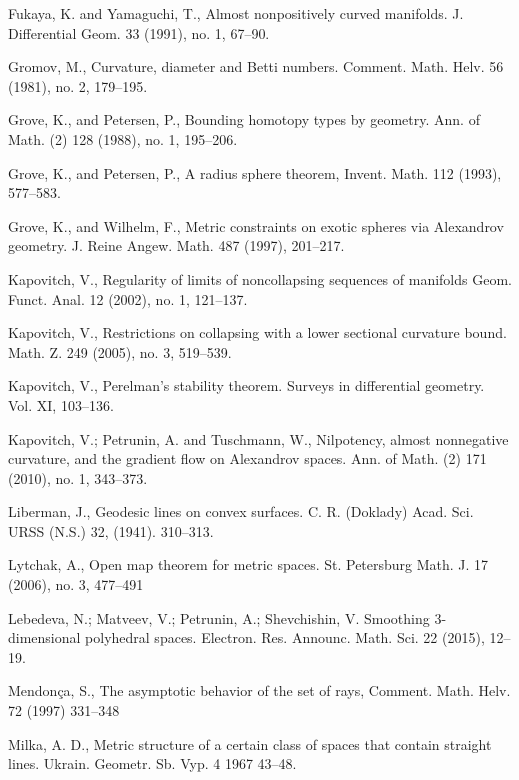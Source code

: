 \documentclass{article}
\begin{document}
\begin{thebibliography}{Bibliography}
Fukaya, K. and Yamaguchi, T., 
Almost nonpositively curved manifolds.  
J. Differential Geom.  33  (1991),  
no. 1, 67--90.

Gromov, M.,
Curvature, diameter and Betti numbers.
Comment. Math. Helv. 56 (1981), no. 2, 179--195. 

Grove, K., and Petersen, P.,
Bounding homotopy types by geometry.
Ann. of Math. (2) 128 (1988), no. 1, 195--206.

Grove, K., and Petersen, P., 
A radius sphere theorem,
Invent. Math. 112 (1993), 577--583.

Grove, K.,
and Wilhelm, F.,
Metric constraints on exotic spheres via Alexandrov geometry.  
J. Reine Angew. Math.  487  (1997), 201--217.

Kapovitch, V., Regularity of limits of noncollapsing sequences of manifolds Geom. Funct. Anal.  12  (2002),  no. 1, 121--137.

Kapovitch, V., 
Restrictions on
collapsing with a lower sectional curvature bound.  Math. Z.  249  (2005),  no.
3, 519--539.

Kapovitch, V., 
Perelman's stability theorem. 
Surveys in differential geometry. Vol. XI, 103--136.

 Kapovitch, V.; 
Petrunin, A. and 
Tuschmann, W., 
Nilpotency, almost nonnegative curvature, and the gradient flow on Alexandrov spaces. 
Ann. of Math. (2) 171 (2010), no. 1, 343--373. 

Liberman, J.,
Geodesic lines on convex surfaces.  C. R.
(Doklady) Acad. Sci. URSS (N.S.)  32,  
(1941). 
310--313.

Lytchak, A.,
Open map theorem for metric spaces.  
St. Petersburg Math. J.  17  (2006),  no. 3, 477--491 

Lebedeva, N.; 
Matveev, V.; 
Petrunin, A.; 
Shevchishin, V.
Smoothing 3-dimensional polyhedral spaces. 
Electron. Res. Announc. Math. Sci. 22 (2015), 12--19.

Mendon\c{c}a, S.,
The asymptotic behavior of the set of rays, 
Comment. Math. Helv. 72 (1997) 331--348

Milka, A. D., 
Metric structure of a certain class of spaces that contain straight lines.  Ukrain. Geometr. Sb. Vyp.  4  1967 43--48.


\end{thebibliography}
\end{document}
